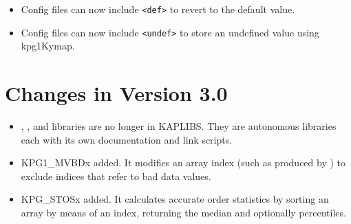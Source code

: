 \documentclass[11pt]{starlink}
\begin{document}
\begin{itemize}
\item Config files can now include \texttt{<def>} to revert to the default value.
\item Config files can now include \texttt{<undef>} to store an undefined
      value using kpg1Kymap.
\end{itemize}


\section{Changes in Version 3.0}
\begin{itemize}
\item {}, , and 
      libraries are no longer in KAPLIBS.  They are autonomous
      libraries each with its own documentation and link scripts.
\item KPG1\_MVBDx added. It modifies an array index (such as produced by
      ) to exclude indices that refer
      to bad data values.
\item KPG\_STOSx added.  It calculates accurate order statistics by
      sorting an array by means of an index, returning the median and
      optionally percentiles.
\end{itemize}
\end{document}
